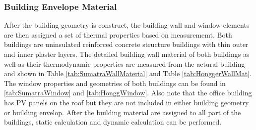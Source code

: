 \documentclass[11pt, a4paper]{article}
\theoremstyle{definition}
\begin{document}
			
		

		\subsubsection{Building Envelope Material}
			After the building geometry is construct, the building wall and window elements are then assigned a set of thermal properties based on measurememt.
			Both buildings are uninsulated reinforced concrete structure buildings with thin outer and inner plaster layers. The detailed building wall material of both buildings as well as their thermodynamic properties are measured from the actural building and shown in Table \ref{tab:SumatraWallMaterial} and Table \ref{tab:HonggerWallMat}. The window properties and geometries of both buildings can be found in \ref{tab:SumatraWindow} and \ref{tab:HonggWindow}. Also note that the office building has PV panels on the roof but they are not included in either building geometry or building envelop. After the building material are assigned to all part of the buildings, static calculation and dynamic calculation can be performed.\\
\end{document}
